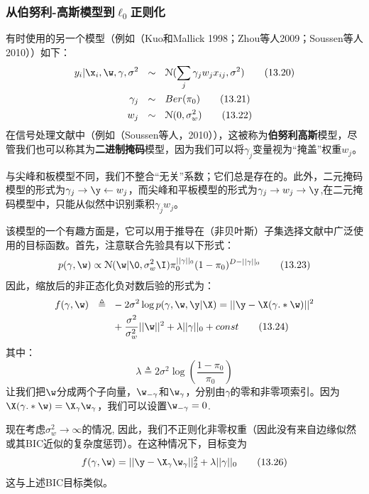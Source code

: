\documentclass[a4paper]{article}
\begin{document}
\subsubsection{从伯努利-高斯模型到$\ell_0 $正则化}
有时使用的另一个模型（例如（Kuo和Mallick 1998；Zhou等人2009；Soussen等人2010））如下： 
\begin{align}
	y_i|\x_i,\w,\gamma,\sigma^2\ \ &\sim\ \ \mathcal{N}(\sum_{j}\gamma_jw_jx_{ij},\sigma^2)\tag{13.20}\\
	\gamma_j\ \ &\sim\ \ Ber(\pi_0)\tag{13.21}\\
	w_j\ \ &\sim\ \ \mathcal{N}(0,\sigma_w^2)\tag{13.22}
\end{align}
在信号处理文献中（例如（Soussen等人，2010）），这被称为\textbf{伯努利高斯}模型，尽管我们也可以称其为\textbf{二进制掩码}模型，因为我们可以将$\gamma_j$变量视为“掩盖”权重$w_j$。 

与尖峰和板模型不同，我们不整合“无关”系数；它们总是存在的。此外，二元掩码模型的形式为$\gamma_j\to \y \gets w_j$，而尖峰和平板模型的形式为$\gamma_j \to w_j \to \y$,在二元掩码模型中，只能从似然中识别乘积$\gamma_jw_j$。 

该模型的一个有趣方面是，它可以用于推导在（非贝叶斯）子集选择文献中广泛使用的目标函数。首先，注意联合先验具有以下形式： 
\begin{equation}
	p(\gamma,\w)\propto \mathcal{N}(\w|\0,\sigma_w^2\I)\pi_0^{||\gamma||_0}(1-\pi_0)^{D-||\gamma||_0}\tag{13.23}
\end{equation}
因此，缩放后的非正态化负对数后验的形式为： 
\begin{align}
	f(\gamma,\w)\ \ \triangleq\ \ &-2\sigma^2\log p(\gamma,\w,\y|\X)=||\y-\X(\gamma.*\w)||^2\\
	&+\frac{\sigma^2}{\sigma_w^2}||\w||^2+\lambda||\gamma||_0+const\tag{13.24}
\end{align}
其中：
\begin{equation}
	\lambda\triangleq 2\sigma^2\log (\frac{1-\pi_0}{\pi_0})\tag{13.25}
\end{equation}
让我们把$\w$分成两个子向量，$\w_{-\gamma}$和$\w_\gamma$，分别由$\gamma$的零和非零项索引。因为$\X(\gamma.*\w)=\X_\gamma\w_\gamma$，我们可以设置$\w_{-\gamma}=0$. 

现在考虑$\sigma_w^2\to \infty$的情况, 因此，我们不正则化非零权重（因此没有来自边缘似然或其BIC近似的复杂度惩罚）。在这种情况下，目标变为 
\begin{equation}
	f(\gamma,\w)=||\y-\X_\gamma\w_\gamma||_2^2+\lambda||\gamma||_0\tag{13.26}
\end{equation}
这与上述BIC目标类似。 
\end{document}
